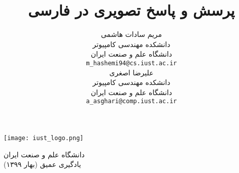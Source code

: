 \documentclass{article}
\title{پرسش و پاسخ تصویری در فارسی}
\author{%
  مریم سادات هاشمی \\
  دانشکده مهندسی کامپیوتر\\
  دانشگاه علم و صنعت ایران\\
  \texttt{m\_hashemi94@cs.iust.ac.ir} \\
   \And
    علیرضا اصغری \\
   دانشکده مهندسی کامپیوتر\\
   دانشگاه علم و صنعت ایران\\
    \texttt{a\_asghari@comp.iust.ac.ir}
}
\begin{document}
\begin{minipage}{0.1\textwidth}%
\texttt{[image: iust\_logo.png]}
\end{minipage}%
\hfill%
\begin{minipage}{0.9\textwidth}\raggedleft
دانشگاه علم و صنعت ایران\\
یادگیری عمیق (بهار ۱۳۹۹)\\
\end{minipage}


\makepertitle






%

\end{document}
